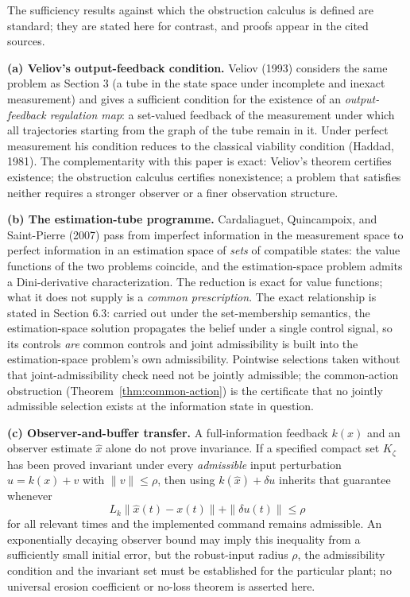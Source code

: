 \documentclass[11pt]{article}
\theoremstyle{definition}
\begin{document}
The sufficiency results against which the obstruction calculus is
defined are standard; they are stated here for contrast, and proofs
appear in the cited sources.

\textbf{(a) Veliov's output-feedback condition.} Veliov (1993) considers the same problem as Section 3 (a tube in the state space under incomplete and inexact measurement) and gives a sufficient condition for the
existence of an \emph{output-feedback regulation map}: a set-valued
feedback of the measurement under which all trajectories starting from
the graph of the tube remain in it. Under perfect measurement his
condition reduces to the classical viability condition (Haddad, 1981).
The complementarity with this paper is exact: Veliov's theorem certifies
existence; the obstruction calculus certifies nonexistence; a problem that satisfies neither requires a stronger observer or a finer observation structure.

\textbf{(b) The estimation-tube programme.} Cardaliaguet, Quincampoix,
and Saint-Pierre (2007) pass from imperfect information in the
measurement space to perfect information in an estimation space of
\emph{sets} of compatible states: the value functions of the two
problems coincide, and the estimation-space problem admits a
Dini-derivative characterization. The reduction is exact for value
functions; what it does not supply is a \emph{common prescription}. The exact relationship is stated in Section 6.3: carried out under the set-membership semantics, the estimation-space solution propagates the belief under a single control signal, so its controls \emph{are} common controls and joint admissibility is built into the estimation-space problem's own admissibility. Pointwise selections taken without that joint-admissibility check need not be jointly admissible; the common-action obstruction (Theorem~\ref{thm:common-action}) is the certificate that no jointly admissible selection exists at the information state in question.

\textbf{(c) Observer-and-buffer transfer.} A full-information feedback \(k(x)\) and an observer estimate \(\hat x\) alone do not prove invariance. If a specified compact set \(K_\zeta\) has been proved invariant under every \emph{admissible} input perturbation \(u=k(x)+v\) with \(\|v\|\le\rho\), then using \(k(\hat x)+\delta u\) inherits that guarantee whenever
\[L_k\|\hat x(t)-x(t)\|+\|\delta u(t)\|\le\rho\]
for all relevant times and the implemented command remains admissible. An exponentially decaying observer bound may imply this inequality from a sufficiently small initial error, but the robust-input radius \(\rho\), the admissibility condition and the invariant set must be established for the particular plant; no universal erosion coefficient or no-loss theorem is asserted here.
\end{document}

